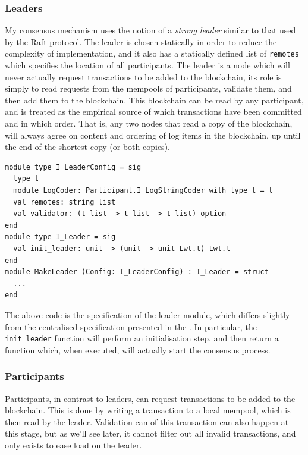 \documentclass[12pt,a4paper,twoside,openright]{report}
\begin{document}
			\subsubsection*{Leaders}
			My consensus mechanism uses the notion of a \textit{strong leader} similar to that used by the Raft protocol. 
			The leader is chosen statically in order to reduce the complexity of implementation, and it also has a statically defined list of \texttt{remotes} which specifies the location of all participants.
			The leader is a node which will never actually request transactions to be added to the blockchain, its role is simply to read requests from the mempools of participants, validate them, and then add them to the blockchain.
			This blockchain can be read by any participant, and is treated as the empirical source of which transactions have been committed and in which order. 
			That is, any two nodes that read a copy of the blockchain, will always agree on content and ordering of log items in the blockchain, up until the end of the shortest copy (or both copies).\\

			\begin{lstlisting}
module type I_LeaderConfig = sig
  type t
  module LogCoder: Participant.I_LogStringCoder with type t = t    
  val remotes: string list
  val validator: (t list -> t list -> t list) option
end
module type I_Leader = sig
  val init_leader: unit -> (unit -> unit Lwt.t) Lwt.t
end
module MakeLeader (Config: I_LeaderConfig) : I_Leader = struct
  ...
end
			\end{lstlisting}

			The above code is the specification of the leader module, which differs slightly from the centralised specification presented in the .
			In particular, the \texttt{init\_leader} function will perform an initialisation step, and then return a function which, when executed, will actually start the consensus process.

			\subsubsection*{Participants}
			Participants, in contrast to leaders, can request transactions to be added to the blockchain. 
			This is done by writing a transaction to a local mempool, which is then read by the leader.
			Validation can of this transaction can also happen at this stage, but as we'll see later, it cannot filter out all invalid transactions, and only exists to ease load on the leader.\\
\end{document}
